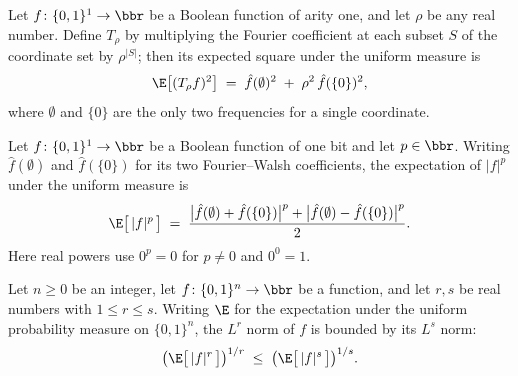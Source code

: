 \begin{lemma}
\label{BooleanAnalysis.Hypercontractivity.expect_noiseOp_sq_one_bit}
\leanok
{}
Let $f\colon\{0,1\}^1\to\bbr$ be a Boolean function of arity one, and let $\rho$ be any
real number. Define $T_\rho$ by multiplying the Fourier coefficient at each subset
$S$ of the coordinate set by $\rho^{|S|}$; then its expected square under the uniform
measure is
\[
  \E\big[(T_\rho f)^2\big] \;=\; \hat f(\emptyset)^2 \;+\; \rho^2\,\hat f(\{0\})^2,
\]
where $\emptyset$ and $\{0\}$ are the only two frequencies for a single coordinate.
\end{lemma}

\begin{lemma}
\label{BooleanAnalysis.Hypercontractivity.expect_abs_rpow_one_bit}
\leanok
{}
Let $f\colon\{0,1\}^1\to\bbr$ be a Boolean function of one bit and let $p\in\bbr$.
Writing $\hat f(\emptyset)$ and $\hat f(\{0\})$ for its two Fourier--Walsh coefficients,
the expectation of $|f|^p$ under the uniform measure is
\[
\E\big[\,|f|^p\,\big] \;=\; \frac{\big|\hat f(\emptyset) + \hat f(\{0\})\big|^p +
\big|\hat f(\emptyset) - \hat f(\{0\})\big|^p}{2}.
\]
Here real powers use $0^p=0$ for $p\ne0$ and $0^0=1$.
\end{lemma}

\begin{lemma}
\label{BooleanAnalysis.Hypercontractivity.lp_norm_mono}
\leanok
{}
Let $n\ge0$ be an integer, let $f\colon\{0,1\}^n\to\bbr$ be a function, and let $r,s$ be real numbers with
$1\le r\le s$. Writing $\E$ for the expectation under the uniform probability measure on
$\{0,1\}^n$, the $L^r$ norm of $f$ is bounded by its $L^s$ norm:
\[
  \big(\E\big[\,|f|^{r}\,\big]\big)^{1/r}\;\le\;\big(\E\big[\,|f|^{s}\,\big]\big)^{1/s}.
\]
\end{lemma}

